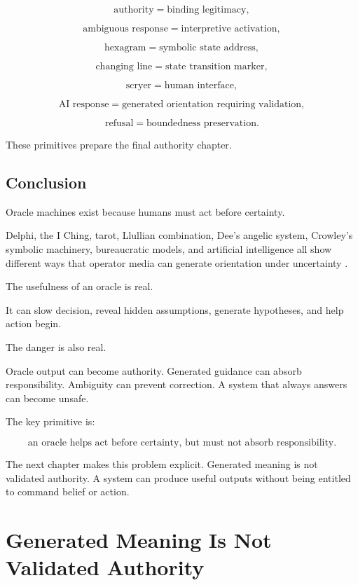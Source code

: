 \documentclass[11pt]{book}
\begin{document}
\[
\text{authority} = \text{binding legitimacy},
\]

\[
\text{ambiguous response} = \text{interpretive activation},
\]

\[
\text{hexagram} = \text{symbolic state address},
\]

\[
\text{changing line} = \text{state transition marker},
\]

\[
\text{scryer} = \text{human interface},
\]

\[
\text{AI response} = \text{generated orientation requiring validation},
\]

\[
\text{refusal} = \text{boundedness preservation}.
\]

These primitives prepare the final authority chapter.

\section{Conclusion}

Oracle machines exist because humans must act before certainty.

Delphi, the I Ching, tarot, Llullian combination, Dee’s angelic system, Crowley’s symbolic machinery, bureaucratic models, and artificial intelligence all show different ways that operator media can generate orientation under uncertainty \cite{Fontenrose1978DelphicOracle,WilhelmBaynes1967IChing,Yates1966ArtMemory,DeeCasaubon1659TrueFaithfulRelation,OConnor2016WeaponsMathDestruction,Cameron2026IPRP}.

The usefulness of an oracle is real.

It can slow decision, reveal hidden assumptions, generate hypotheses, and help action begin.

The danger is also real.

Oracle output can become authority. Generated guidance can absorb responsibility. Ambiguity can prevent correction. A system that always answers can become unsafe.

The key primitive is:

\[
\text{an oracle helps act before certainty, but must not absorb responsibility}.
\]

The next chapter makes this problem explicit. Generated meaning is not validated authority. A system can produce useful outputs without being entitled to command belief or action.

\chapter{Generated Meaning Is Not Validated Authority}
\end{document}
